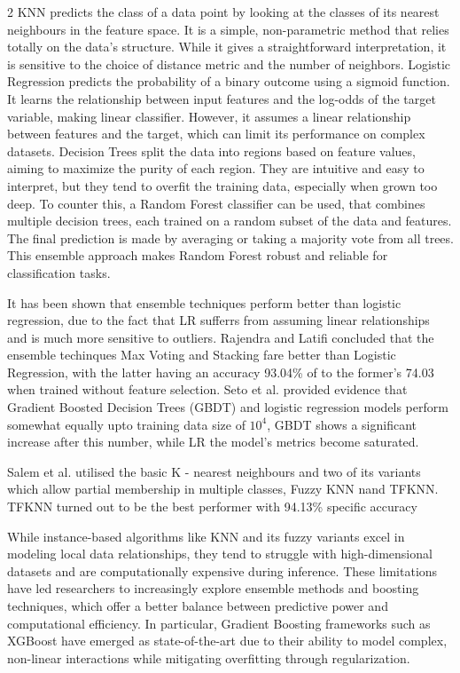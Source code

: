 \documentclass{article}
\begin{document}
\begin{multicols}{2}
KNN predicts the class of a data point by looking at the classes of its nearest neighbours in the feature space. It is a simple, non-parametric method that relies totally on the data’s structure. While it gives a straightforward interpretation, it is sensitive to the choice of distance metric and the number of neighbors.
Logistic Regression predicts the probability of a binary outcome using a sigmoid function. It learns the relationship between input features and the log-odds of the target variable, making linear classifier. However, it assumes a linear relationship between features and the target, which can limit its performance on complex datasets.
Decision Trees split the data into regions based on feature values, aiming to maximize the purity of each region. 
They are intuitive and easy to interpret, but they tend to overfit the training data, especially when grown too deep.
To counter this, a Random Forest classifier can be used, that combines multiple decision trees, each trained on a random subset of the data and features. The final prediction is made by averaging or taking a majority vote from all trees. This ensemble approach makes Random Forest robust and reliable for classification tasks.

It has been shown that ensemble techniques perform better than logistic regression, due to the fact that LR sufferrs from assuming linear relationships and is much more sensitive to outliers.
Rajendra and Latifi concluded that the ensemble techinques Max Voting and Stacking fare better than Logistic Regression, with the latter having an accuracy 93.04\% of to the former's 74.03 when trained without feature selection\cite{rajendra2021prediction}.
Seto et al. provided evidence that Gradient Boosted Decision Trees (GBDT) and logistic regression models perform somewhat equally upto training data size of $10^{4}$, GBDT shows a significant increase after this number, while LR the model's metrics become saturated\cite{seto2022gradient}.

Salem et al. utilised the basic K - nearest neighbours and two of its variants which allow partial membership in multiple classes, Fuzzy KNN nand TFKNN. TFKNN turned out to be the best performer with 94.13\% specific accuracy\cite{salem2022fine}

While instance-based algorithms like KNN and its fuzzy variants excel in modeling local data relationships, they tend to struggle with high-dimensional datasets and are computationally expensive during inference. These limitations have led researchers to increasingly explore ensemble methods and boosting techniques, which offer a better balance between predictive power and computational efficiency. In particular, Gradient Boosting frameworks such as XGBoost have emerged as state-of-the-art due to their ability to model complex, non-linear interactions while mitigating overfitting through regularization.


\end{multicols}
\end{document}
